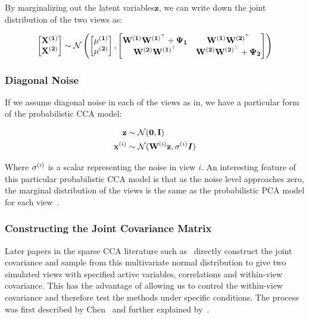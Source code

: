 By marginalizing out the latent variables\(\mathbf{z}\), we can write down the joint distribution of the two views as:

\begin{align}
    \begin{bmatrix} \bold{X^{(1)}} \\ \bold{X^{(2)}} \end{bmatrix} \sim \mathcal{N} \left( \begin{bmatrix} \bold{\mu^{(1)}} \\ \bold{\mu^{(2)}} \end{bmatrix}, \begin{bmatrix} \bold{W^{(1)}W^{(1)^{\top}}} + \bold{\Psi_1} & \bold{W^{(1)}W^{(2)^{\top}}} \\ \bold{W^{(2)}W^{(1)^{\top}}} & \bold{W^{(2)}W^{(2)^{\top}}} + \bold{\Psi_2} \end{bmatrix} \right)
\end{align}

\subsubsection{Diagonal Noise}

If we assume diagonal noise in each of the views as in\cite{witten2009extensions}, we have a
particular form of the probabilistic CCA model:

\begin{align}
    \mathbf{z}& \sim \mathcal{N}(\mathbf{0}, \mathbf{I})\\
    \mathbf{x}^{(i)} & \sim \mathcal{N}(\mathbf{W}^{(i)} \mathbf{z}, \sigma^{(i)}\boldsymbol{I})
\end{align}

Where \(\sigma^{(i)}\) is a scalar representing the noise in view \(i\).
An interesting feature of this particular probabilistic CCA model is that as the noise level approaches zero, the
marginal distribution of the views is the same as the probabilistic PCA model for each view~\cite{tipping1999probabilistic}.

\subsubsection{Constructing the Joint Covariance Matrix}
Later papers in the sparse CCA literature such as~\cite{mai2019iterative,chen2013sparse} directly construct the joint covariance and sample from this multivariate normal distribution to give two simulated views with specified active variables, correlations and within-view covariance.
This has the advantage of allowing us to control the within-view covariance and therefore test the methods under specific conditions.
The process was first described by Chen~\cite{chen2013sparse} and further explained by~\cite{suo2017sparse}.

